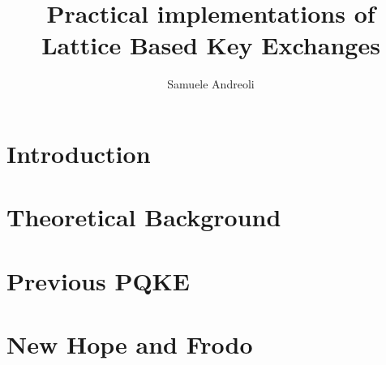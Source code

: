 \documentclass[12pt,a4paper,twoside]{styles/Phd_1}
\let\origdoublepage\cleardoublepage
\newcommand{\clearemptydoublepage}{%
\clearpage
{\pagestyle{empty}\origdoublepage}%
}
\let\cleardoublepage\clearemptydoublepage
\begin{document}

\title{Practical implementations of Lattice Based Key Exchanges}
\author{Samuele Andreoli}

\twosupervisors
{}

\secondreader{}

\frontespizio     %
\cleardoublepage
\signaturepage     %
\cleardoublepage
\cleardoublepage \setcounter{page}{1} 
\pagestyle{plain} \tableofcontents

\chapter*{Introduction}\label{ch:introduction}



\chapter{Theoretical Background}\label{ch:th_background}


\chapter{Previous PQKE}


\chapter{New Hope and Frodo}\label{ch:protocols}

\end{document}
